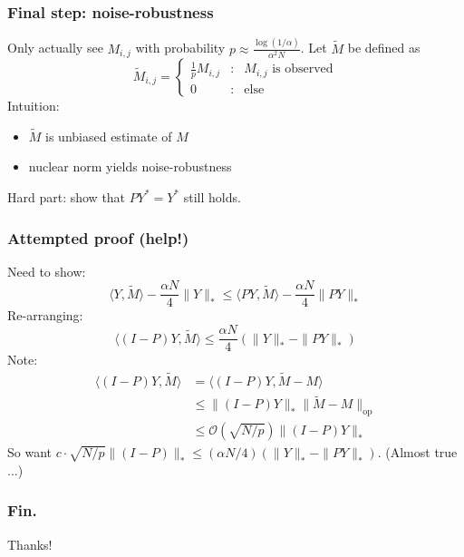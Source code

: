 \documentclass{beamer}
\newcommand{\oo}{\mathcal{O}}
\newcommand{\p}[1]{\left(#1\right)}
\begin{document}
\begin{frame}
\frametitle{Final step: noise-robustness}
Only actually see $M_{i,j}$ with probability $p \approx \frac{\log(1/\alpha)}{\alpha^2N}$.
\pause \vskip 0.2in
Let $\tilde{M}$ be defined as
\[ \tilde{M}_{i,j} = \left\{ \begin{array}{ccl} \frac{1}{p}M_{i,j} & : & M_{i,j} \text{ is observed} \\ 0 & : & \text{else} \end{array} \right. \]
\pause
Intuition:
\begin{itemize}
\item $\tilde{M}$ is unbiased estimate of $M$
\item nuclear norm yields noise-robustness
\end{itemize}
\pause
Hard part: show that $PY^* = Y^*$ still holds.
\end{frame}

\newcommand{\op}{\mathrm{op}}
\begin{frame}
\frametitle{Attempted proof (help!)}
Need to show:
\[ \langle Y, \tilde{M} \rangle - \frac{\alpha N}{4}\|Y\|_* \leq \langle PY, \tilde{M} \rangle - \frac{\alpha N}{4} \|PY\|_* \]
\pause
Re-arranging:
\[ \langle (I-P)Y, \tilde{M} \rangle \leq \frac{\alpha N}{4}\p{\|Y\|_* - \|PY\|_*} \]
\pause
Note:
\vskip -0.35in
\begin{align*}
\langle (I-P)Y, \tilde{M} \rangle &= \langle (I-P)Y, \tilde{M} - M \rangle \\
 &\leq \|(I-P)Y\|_*\|\tilde{M} - M\|_{\op} \\
 &\leq \oo\p{\sqrt{N/p}}\|(I-P)Y\|_*
\end{align*}
So want $c \cdot \sqrt{N/p}\|(I-P)\|_* \leq (\alpha N/4)\p{\|Y\|_* - \|PY\|_*}$. (Almost true$\ldots$)
\end{frame}

\begin{frame}
\frametitle{Fin.}
Thanks!
\end{frame}
\end{document}
